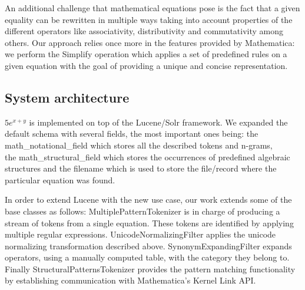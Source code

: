 \documentclass{sig-alternate}
\begin{document}
An additional challenge that mathematical equations pose is the fact that a given equality can be rewritten in multiple ways taking into account properties of the different operators like associativity, distributivity and commutativity among others. Our approach relies once more in the features provided by Mathematica: we perform the {\codefont Simplify} operation which applies a set of predefined rules on a given equation with the goal of providing a unique and concise representation.

\subsection{System architecture}
$5e^{x+y}$ is implemented on top of the Lucene/Solr framework. We expanded the default schema with several fields, the most important ones being: the {\codefont math\_notational\_field} which stores all the described tokens and n-grams, \\ the {\codefont math\_structural\_field} which stores the occurrences of predefined algebraic structures and the {\codefont filename} which is used to store the file/record where the particular equation was found. 

In order to extend Lucene with the new use case, our work extends some of the base classes as follows: {\codefont MultiplePatternTokenizer} is in charge of producing a stream of tokens from a single equation. These tokens are identified by applying multiple regular expressions. {\codefont UnicodeNormalizingFilter} applies the unicode normalizing transformation described above. {\codefont SynonymExpandingFilter} expands operators, using a manually computed table, with the category they belong to. Finally {\codefont StructuralPatternsTokenizer} provides the pattern matching functionality by establishing communication with Mathematica's {\codefont Kernel Link} API.
\end{document}
